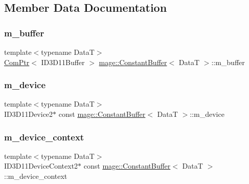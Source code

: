 \subsection{Member Data Documentation}
\hypertarget{structmage_1_1_constant_buffer_a394571e3102fe053f3357e2e218c0eda}{}\label{structmage_1_1_constant_buffer_a394571e3102fe053f3357e2e218c0eda} 
\subsubsection{\texorpdfstring{m\+\_\+buffer}{m\_buffer}}
{\footnotesize\ttfamily template$<$typename DataT$>$ \\
\hyperlink{namespacemage_ae74f374780900893caa5555d1031fd79}{Com\+Ptr}$<$ I\+D3\+D11\+Buffer $>$ \hyperlink{structmage_1_1_constant_buffer}{mage\+::\+Constant\+Buffer}$<$ DataT $>$\+::m\+\_\+buffer\hspace{0.3cm}{\ttfamily [private]}}

\hypertarget{structmage_1_1_constant_buffer_a52d9b6722b8f7e20d079d5575169995f}{}\label{structmage_1_1_constant_buffer_a52d9b6722b8f7e20d079d5575169995f} 
\subsubsection{\texorpdfstring{m\+\_\+device}{m\_device}}
{\footnotesize\ttfamily template$<$typename DataT$>$ \\
I\+D3\+D11\+Device2$\ast$ const \hyperlink{structmage_1_1_constant_buffer}{mage\+::\+Constant\+Buffer}$<$ DataT $>$\+::m\+\_\+device\hspace{0.3cm}{\ttfamily [private]}}

\hypertarget{structmage_1_1_constant_buffer_a4b41661b3c7e0a5880f422cd93e822aa}{}\label{structmage_1_1_constant_buffer_a4b41661b3c7e0a5880f422cd93e822aa} 
\subsubsection{\texorpdfstring{m\+\_\+device\+\_\+context}{m\_device\_context}}
{\footnotesize\ttfamily template$<$typename DataT$>$ \\
I\+D3\+D11\+Device\+Context2$\ast$ const \hyperlink{structmage_1_1_constant_buffer}{mage\+::\+Constant\+Buffer}$<$ DataT $>$\+::m\+\_\+device\+\_\+context\hspace{0.3cm}{\ttfamily [private]}}

